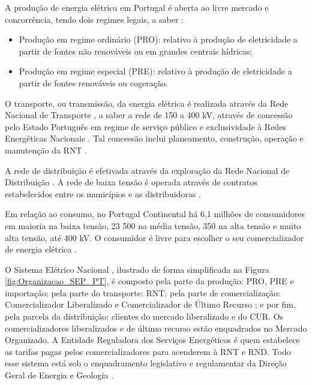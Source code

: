 A produção de energia elétrica em Portugal é aberta ao livre mercado e concorrência, tendo dois regimes legais, a saber \cite{REN-site}:
\begin{itemize}
\item Produção em regime ordinário (PRO): relativo à produção de eletricidade a partir de fontes não renováveis ou em grandes centrais hídricas;
\item Produção em regime especial (PRE): relativo à produção de eletricidade a partir de fontes renováveis ou cogeração.
\end{itemize}

O transporte, ou transmissão, da energia elétrica é realizada através da Rede Nacional de Transporte
, a saber a rede de 150 a 400 kV, através de concessão pelo Estado Português em regime de serviço público e exclusividade à Redes Energéticas Nacionais %
. Tal concessão inclui planeamento, construção, operação e manutenção da RNT \cite{REN-site}.

A rede de distribuição é efetivada através da exploração da Rede Nacional de Distribuição %
. A rede de baixa tensão é operada através de contratos estabelecidos entre os municípios e as distribuidoras \cite{REN-site}.

Em relação ao consumo, no Portugal Continental há 6,1 milhões de consumidores em maioria na baixa tensão, 23 500 na média tensão, 350 na alta tensão e muito alta tensão, até 400 kV. O consumidor é livre para escolher o seu comercializador de energia elétrica \cite{REN-site}.

O Sistema Elétrico Nacional %
, ilustrado de forma simplificada na Figura \ref{fig:Organizacao_SEP_PT}, é composto pela parte da produção: PRO, PRE e importação; pela parte do transporte: RNT; pela parte de comercialização: Comercializador Liberalizado e Comercializador de Último Recurso %
; e por fim, pela parcela da distribuição: clientes do mercado liberalizado e do CUR. Os comercializadores liberalizados e de último recurso estão enquadrados no Mercado Organizado. A Entidade Reguladora dos Serviços Energéticos %
é quem estabelece as tarifas pagas pelos comercializadores para acenderem à RNT e RND. Todo esse sistema está sob o enquadramento legislativo e regulamentar da Direção Geral de Energia e Geologia %
\cite{gil2010analise}.

